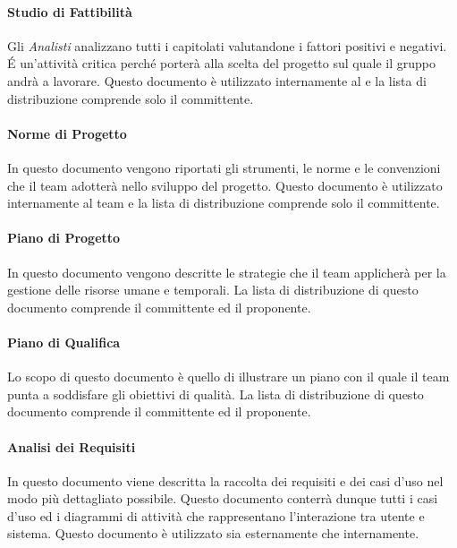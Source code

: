 \paragraph{Studio di Fattibilità } 
Gli \emph{Analisti} analizzano tutti i capitolati valutandone
i fattori positivi e negativi. \'E un'attività critica perché porterà alla scelta del 
progetto sul quale il gruppo andrà a lavorare.  Questo
documento è utilizzato internamente al  e la lista di
distribuzione comprende solo il committente. 

\paragraph{Norme di Progetto }

In questo documento vengono riportati gli strumenti, le norme e le
convenzioni che il team adotterà nello sviluppo del progetto. Questo
documento è utilizzato internamente al team e la lista di
distribuzione comprende solo il committente. 

\paragraph{Piano di Progetto }

In questo documento vengono descritte le strategie che il team
applicherà per la gestione delle risorse umane e temporali. La lista
di distribuzione di questo documento comprende il committente ed il
proponente. 

\paragraph{Piano di Qualifica }

Lo scopo di questo documento è quello di illustrare un piano con il
quale  il team punta a soddisfare gli obiettivi di qualità.  La lista
di distribuzione di questo documento comprende il committente ed il
proponente. 

\paragraph{Analisi dei Requisiti }

In questo documento viene descritta la raccolta dei requisiti e dei
casi d'uso nel modo più dettagliato possibile. Questo documento
conterrà dunque tutti i casi d'uso ed
i diagrammi di attività che rappresentano l'interazione 
tra utente e sistema. Questo documento è utilizzato sia
esternamente che internamente. 



